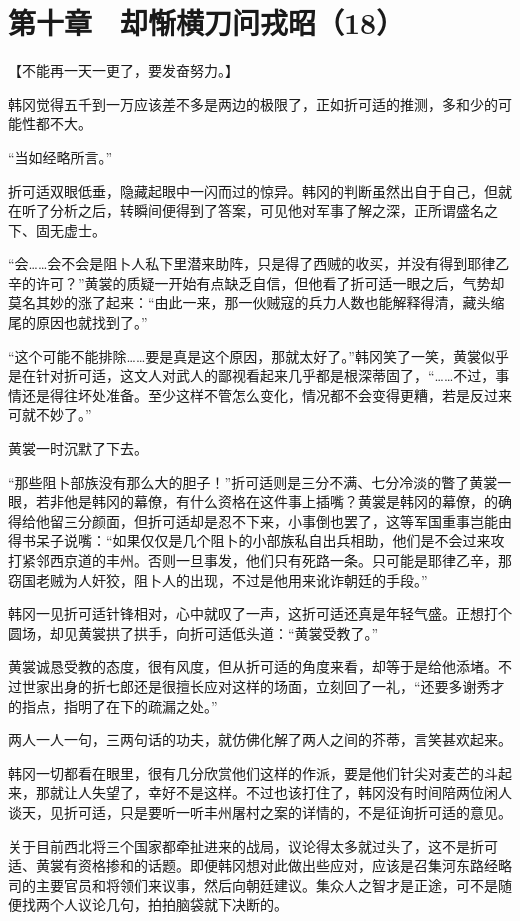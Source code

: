 \section{第十章　却惭横刀问戎昭（18）}

【不能再一天一更了，要发奋努力。】

韩冈觉得五千到一万应该差不多是两边的极限了，正如折可适的推测，多和少的可能性都不大。

“当如经略所言。”

折可适双眼低垂，隐藏起眼中一闪而过的惊异。韩冈的判断虽然出自于自己，但就在听了分析之后，转瞬间便得到了答案，可见他对军事了解之深，正所谓盛名之下、固无虚士。

“会……会不会是阻卜人私下里潜来助阵，只是得了西贼的收买，并没有得到耶律乙辛的许可？”黄裳的质疑一开始有点缺乏自信，但他看了折可适一眼之后，气势却莫名其妙的涨了起来：“由此一来，那一伙贼寇的兵力人数也能解释得清，藏头缩尾的原因也就找到了。”

“这个可能不能排除……要是真是这个原因，那就太好了。”韩冈笑了一笑，黄裳似乎是在针对折可适，这文人对武人的鄙视看起来几乎都是根深蒂固了，“……不过，事情还是得往坏处准备。至少这样不管怎么变化，情况都不会变得更糟，若是反过来可就不妙了。”

黄裳一时沉默了下去。

“那些阻卜部族没有那么大的胆子！”折可适则是三分不满、七分冷淡的瞥了黄裳一眼，若非他是韩冈的幕僚，有什么资格在这件事上插嘴？黄裳是韩冈的幕僚，的确得给他留三分颜面，但折可适却是忍不下来，小事倒也罢了，这等军国重事岂能由得书呆子说嘴：“如果仅仅是几个阻卜的小部族私自出兵相助，他们是不会过来攻打紧邻西京道的丰州。否则一旦事发，他们只有死路一条。只可能是耶律乙辛，那窃国老贼为人奸狡，阻卜人的出现，不过是他用来讹诈朝廷的手段。”

韩冈一见折可适针锋相对，心中就叹了一声，这折可适还真是年轻气盛。正想打个圆场，却见黄裳拱了拱手，向折可适低头道：“黄裳受教了。”

黄裳诚恳受教的态度，很有风度，但从折可适的角度来看，却等于是给他添堵。不过世家出身的折七郎还是很擅长应对这样的场面，立刻回了一礼，“还要多谢秀才的指点，指明了在下的疏漏之处。”

两人一人一句，三两句话的功夫，就仿佛化解了两人之间的芥蒂，言笑甚欢起来。

韩冈一切都看在眼里，很有几分欣赏他们这样的作派，要是他们针尖对麦芒的斗起来，那就让人失望了，幸好不是这样。不过也该打住了，韩冈没有时间陪两位闲人谈天，见折可适，只是要听一听丰州屠村之案的详情的，不是征询折可适的意见。

关于目前西北将三个国家都牵扯进来的战局，议论得太多就过头了，这不是折可适、黄裳有资格掺和的话题。即便韩冈想对此做出些应对，应该是召集河东路经略司的主要官员和将领们来议事，然后向朝廷建议。集众人之智才是正途，可不是随便找两个人议论几句，拍拍脑袋就下决断的。

